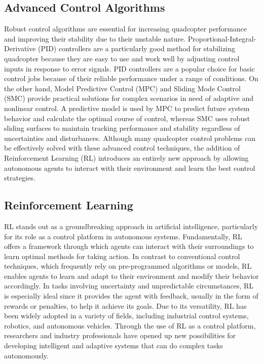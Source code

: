     \subsection{Advanced Control Algorithms}
    Robust control algorithms are essential for increasing quadcopter performance and improving their stability due to their unstable nature. Proportional-Integral-Derivative (PID) controllers are a particularly good method for stabilizing quadcopter because they are easy to use and work well by adjusting control inputs in response to error signals. PID controllers are a popular choice for basic control jobs because of their reliable performance under a range of conditions. On the other hand, Model Predictive Control (MPC) and Sliding Mode Control (SMC) provide practical solutions for complex scenarios in need of adaptive and nonlinear control. A predictive model is used by MPC to predict future system behavior and calculate the optimal course of control, whereas SMC uses robust sliding surfaces to maintain tracking performance and stability regardless of uncertainties and disturbances. Although many quadcopter control problems can be effectively solved with these advanced control techniques, the addition of Reinforcement Learning (RL) introduces an entirely new approach by allowing autonomous agents to interact with their environment and learn the best control strategies.
    \subsection{Reinforcement Learning}
    RL stands out as a groundbreaking approach in artificial intelligence, particularly for its role as a control platform in autonomous systems. Fundamentally, RL offers a framework through which agents can interact with their surroundings to learn optimal methods for taking action. In contrast to conventional control techniques, which frequently rely on pre-programmed algorithms or models, RL enables agents to learn and adapt to their environment and modify their behavior accordingly. In tasks involving uncertainty and unpredictable circumstances, RL is especially ideal since it provides the agent with feedback, usually in the form of rewards or penalties, to help it achieve its goals. Due to its versatility, RL has been widely adopted in a variety of fields, including industrial control systems, robotics, and autonomous vehicles. Through the use of RL as a control platform, researchers and industry professionals have opened up new possibilities for developing intelligent and adaptive systems that can do complex tasks autonomously.
